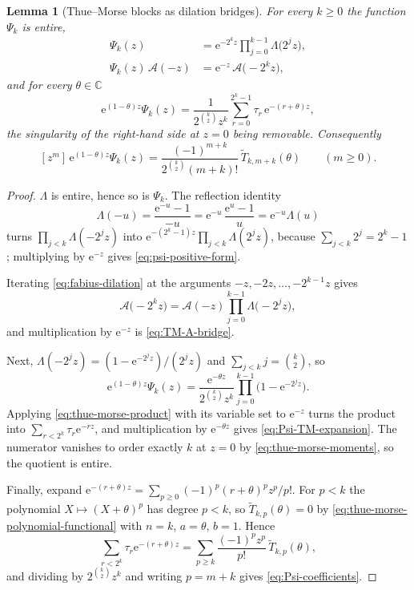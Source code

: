 \documentclass[11pt,oneside,openany]{book}
\newtheorem{lemma}[lemma]{Lemma}
\theoremstyle{definition}
\theoremstyle{remark}
\newcommand{\C}{\mathbb C}
\newcommand{\e}{\mathrm e}
\begin{document}
\begin{lemma}[Thue--Morse blocks as dilation bridges]\label{lem:thue-morse-dilation-bridge}
For every $k\ge0$ the function $\Psi_k$ is entire,
\begin{align}
 \Psi_k(z)&=\e^{-2^kz}\prod_{j=0}^{k-1}\Lambda\bigl(2^jz\bigr),
 \label{eq:psi-positive-form}\\
 \Psi_k(z)\,\mathcal A(-z)&=\e^{-z}\,\mathcal A\bigl(-2^kz\bigr),
 \label{eq:TM-A-bridge}
\end{align}
and for every $\theta\in\C$
\begin{equation}\label{eq:Psi-TM-expansion}
 \e^{(1-\theta)z}\Psi_k(z)
 =\frac1{2^{\binom k2}z^k}\sum_{r=0}^{2^k-1}\tau_r\,\e^{-(r+\theta)z},
\end{equation}
the singularity of the right-hand side at $z=0$ being removable.  Consequently
\begin{equation}\label{eq:Psi-coefficients}
 [z^m]\,\e^{(1-\theta)z}\Psi_k(z)
 =\frac{(-1)^{m+k}}{2^{\binom k2}(m+k)!}\,\widetilde T_{k,m+k}(\theta)
 \qquad(m\ge0).
\end{equation}
\end{lemma}

\begin{proof}
$\Lambda$ is entire, hence so is $\Psi_k$.  The reflection identity
\[
 \Lambda(-u)=\frac{\e^{-u}-1}{-u}=\e^{-u}\,\frac{\e^{u}-1}{u}=\e^{-u}\Lambda(u)
\]
turns $\prod_{j<k}\Lambda(-2^jz)$ into $\e^{-(2^k-1)z}\prod_{j<k}\Lambda(2^jz)$, because
$\sum_{j<k}2^j=2^k-1$; multiplying by $\e^{-z}$ gives \eqref{eq:psi-positive-form}.

Iterating \eqref{eq:fabius-dilation} at the arguments $-z,-2z,\ldots,-2^{k-1}z$ gives
\[
 \mathcal A\bigl(-2^kz\bigr)=\mathcal A(-z)\prod_{j=0}^{k-1}\Lambda\bigl(-2^jz\bigr),
\]
and multiplication by $\e^{-z}$ is \eqref{eq:TM-A-bridge}.

Next, $\Lambda(-2^jz)=(1-\e^{-2^jz})/(2^jz)$ and $\sum_{j<k}j=\binom k2$, so
\[
 \e^{(1-\theta)z}\Psi_k(z)
 =\frac{\e^{-\theta z}}{2^{\binom k2}z^k}
  \prod_{j=0}^{k-1}\bigl(1-\e^{-2^jz}\bigr).
\]
Applying \eqref{eq:thue-morse-product} with its variable set to $\e^{-z}$ turns the
product into $\sum_{r<2^k}\tau_r\e^{-rz}$, and multiplication by $\e^{-\theta z}$ gives
\eqref{eq:Psi-TM-expansion}.  The numerator vanishes to order exactly $k$ at $z=0$ by
\eqref{eq:thue-morse-moments}, so the quotient is entire.

Finally, expand $\e^{-(r+\theta)z}=\sum_{p\ge0}(-1)^p(r+\theta)^pz^p/p!$.  For $p<k$ the
polynomial $X\mapsto(X+\theta)^p$ has degree $p<k$, so
$\widetilde T_{k,p}(\theta)=0$ by \eqref{eq:thue-morse-polynomial-functional} with $n=k$,
$a=\theta$, $b=1$.  Hence
\[
 \sum_{r<2^k}\tau_r\e^{-(r+\theta)z}
 =\sum_{p\ge k}\frac{(-1)^pz^p}{p!}\,\widetilde T_{k,p}(\theta),
\]
and dividing by $2^{\binom k2}z^k$ and writing $p=m+k$ gives \eqref{eq:Psi-coefficients}.
\end{proof}
\end{document}
